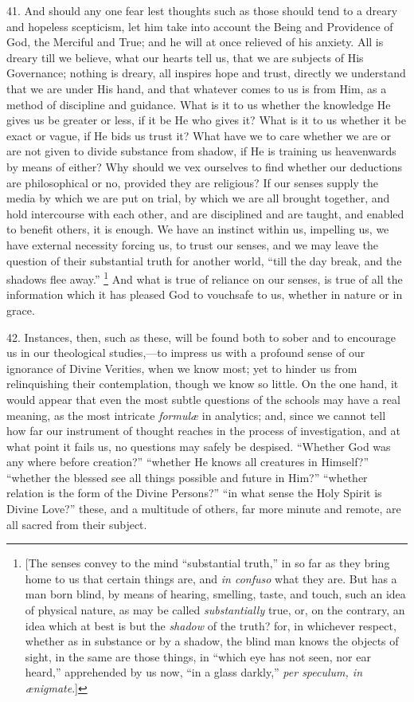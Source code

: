 41. And should any one fear lest thoughts such as those should tend
to a dreary and hopeless scepticism, let him take into account the
Being and Providence of God, the Merciful and True; and he will at
once relieved of his anxiety. All is dreary till we believe, what our
hearts tell us, that we are subjects of His Governance; nothing is
dreary, all inspires hope and trust, directly we understand that we
are under His hand, and that whatever comes to us is from Him, as a
method of discipline and guidance. What is it to us whether the
knowledge He gives us be greater or less, if it be He who gives it?
What is it to us whether it be exact or vague, if He bids us trust it?
What have we to care whether we are or are not given to divide
substance from shadow, if He is training us heavenwards by means of
either? Why should we vex ourselves to find whether our deductions are
philosophical or no, provided they are religious? If our senses supply
the media by which we are put on trial, by which we are all brought
together, and hold intercourse with each other, and are disciplined
and are taught, and enabled to benefit others, it is enough. We have
an instinct within us, impelling us, we have external necessity
forcing us, to trust our senses, and we may leave the question of
their substantial truth for another world, ``till the day break,
and the shadows flee away.'' \footnote{[The senses convey to the mind ``substantial truth,'' in
so far as they bring home to us that certain things are, and \emph{in
confuso} what they are. But has a man born blind, by means of
hearing, smelling, taste, and touch, such an idea of physical nature,
as may be called \emph{substantially} true, or, on the contrary, an
idea which at best is but the \emph{shadow} of the truth? for, in
whichever respect, whether as in substance or by a shadow, the blind
man knows the objects of sight, in the same are those things, in
``which eye has not seen, nor ear heard,'' apprehended by us
now, ``in a glass darkly,'' \emph{per speculum, in ænigmate}.]} And what is true of reliance
on our senses, is true of all the information which it has pleased God
to vouchsafe to us, whether in nature or in grace.

42. Instances, then, such as these, will be found both to sober and
to encourage us in our theological studies,—to impress us with a
profound sense of our ignorance of Divine Verities, when we know most;
yet to hinder us from relinquishing their contemplation, though we
know so little. On the one hand, it would appear that even the most
subtle questions of the schools may have a real meaning, as the most
intricate \emph{formulæ} in analytics; and, since we cannot tell how
far our instrument of thought reaches in the process of investigation,
and at what point it fails us, no questions may safely be despised.
``Whether God was any where before creation?'' ``whether
He knows all creatures in Himself?'' ``whether the blessed see
all things possible and future in Him?'' ``whether relation is
the form of the Divine Persons?'' ``in what sense the Holy
Spirit is Divine Love?'' these, and a multitude of others, far
more minute and remote, are all sacred from their subject.

